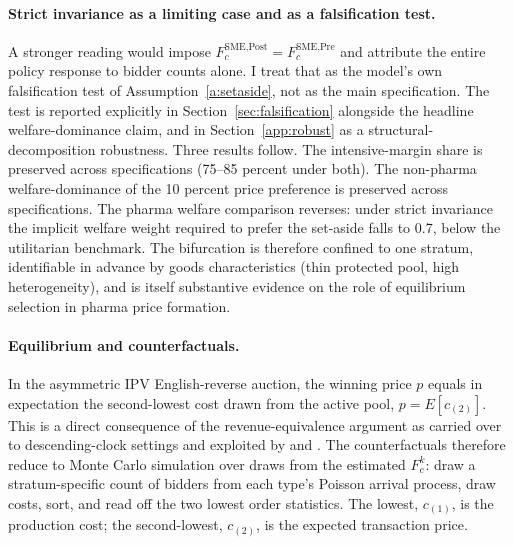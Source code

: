 \paragraph{Strict invariance as a limiting case and as a falsification test.} A stronger reading would impose $F_c^{\text{SME,Post}} = F_c^{\text{SME,Pre}}$ and attribute the entire policy response to bidder counts alone. I treat that as the model's own falsification test of Assumption~\ref{a:setaside}, not as the main specification. The test is reported explicitly in Section~\ref{sec:falsification} alongside the headline welfare-dominance claim, and in Section~\ref{app:robust} as a structural-decomposition robustness. Three results follow. The intensive-margin share is preserved across specifications (75--85 percent under both). The non-pharma welfare-dominance of the 10 percent price preference is preserved across specifications. The pharma welfare comparison reverses: under strict invariance the implicit welfare weight required to prefer the set-aside falls to 0.7, below the utilitarian benchmark. The bifurcation is therefore confined to one stratum, identifiable in advance by goods characteristics (thin protected pool, high heterogeneity), and is itself substantive evidence on the role of equilibrium selection in pharma price formation.

\paragraph{Equilibrium and counterfactuals.} In the asymmetric IPV English-reverse auction, the winning price $p$ equals in expectation the second-lowest cost drawn from the active pool, $p = E[c_{(2)}]$. This is a direct consequence of the \citet{vickrey1961} revenue-equivalence argument as carried over to descending-clock settings and exploited by \citet{krasnokutskaya2011} and \citet{maskinriley2000}. The counterfactuals therefore reduce to Monte Carlo simulation over draws from the estimated $F_c^k$: draw a stratum-specific count of bidders from each type's Poisson arrival process, draw costs, sort, and read off the two lowest order statistics. The lowest, $c_{(1)}$, is the production cost; the second-lowest, $c_{(2)}$, is the expected transaction price.

